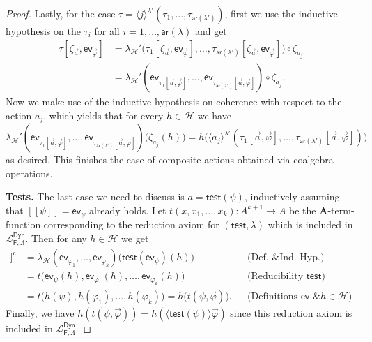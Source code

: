 \documentclass[10pt,a4paper]{amsart}
\newcommand{\LTDyn}{\mathcal{L}_{\func{F}, \Pred}^\mathsf{Dyn}}
\newcommand{\NMH}{\mathcal{H}}
\newcommand{\Pred}{\Lambda}
\newcommand{\alg}[1]{\mathbf{#1}}
\newcommand{\arity}{\mathsf{ar}}
\newcommand{\diam}[1]{\langle {#1} \rangle}
\newcommand{\ev}{\mathsf{ev}}
\newcommand{\func}[1]{\mathsf{#1}}
\newcommand{\sem}[1]{[\![{#1}]\!]}
\newcommand{\test}{\mathsf{test}}
\begin{document}
\begin{proof}
Lastly, for the case $\tau = \diam{j}^{\lambda'}(\tau_1, \dots, \tau_{\arity(\lambda')})$, first we use the inductive hypothesis on the $\tau_i$ for all $i = 1,\dots, \arity(\lambda)$ and get 
\begin{align*}
\tau[\zeta_{\vec{a}}, \ev_{\vec{\varphi}}] & = \lambda_\NMH'\big(\tau_1[\zeta_{\vec{a}}, \ev_{\vec{\varphi}}], \dots, \tau_{\arity(\lambda')}[\zeta_{\vec{a}}, \ev_{\vec{\varphi}}]\big) \circ \zeta_{a_j} \\
& = \lambda_\NMH'(\ev_{\tau_1[\vec{a}, \vec{\varphi}]}, \dots, \ev_{\tau_{\arity(\lambda')}[\vec{a}, \vec{\varphi}]} ) \circ \zeta_{a_j}.
\end{align*}
Now we make use of the inductive hypothesis on coherence with respect to the action $a_j$, which yields that for every $h \in \NMH$ we have 
$$
\lambda_\NMH'(\ev_{\tau_1[\vec{a}, \vec{\varphi}]}, \dots, \ev_{\tau_{\arity(\lambda')}[\vec{a}, \vec{\varphi}]} ) \big( \zeta_{a_j}(h)\big) = h\big(\diam{a_j}^{\lambda'} (\tau_1[\vec{a}, \vec{\varphi}], \dots, \tau_{\arity(\lambda')}[\vec{a}, \vec{\varphi}])\big)
$$
as desired. This finishes the case of composite actions obtained via coalgebra operations.

\textbf{Tests.}
The last case we need to discuss is $a = \test(\psi)$, inductively assuming that $\sem{\psi} = \ev_\psi$ already holds. Let $t(x, x_1, \dots, x_k) \colon A^{k+1} \to A$ be the $\alg{A}$-term-function corresponding to the reduction axiom for $(\test, \lambda)$ which is included in $\LTDyn$. Then for any $h \in \NMH$ we get  
\begin{align*}
\sem{\diam{\test(\psi)}^\lambda(\vec{\varphi})}^\mathrm{c} & = \lambda_{\NMH}(\ev_{\varphi_1}, \dots, \ev_{\varphi_k})\big(\test(\ev_{\psi})(h)\big) && \text{(Def. \& Ind. Hyp.)} \\ 
& = t\big(\ev_{\psi}(h), \ev_{\varphi_1}(h), \dots, \ev_{\varphi_k}(h)\big) && \text{(Reducibility $\test$)} \\ 
& = t\big(h(\psi), h(\varphi_1), \dots,h(\varphi_k)\big)  = h\big(t(\psi, \vec{\varphi})\big). && \text{(Definitions $\ev$ \& $h \in \NMH$)}  
\end{align*} 
Finally, we have $h(t(\psi, \vec{\varphi})) = h(\diam{\test(\psi)}\vec{\varphi})$ since this reduction axiom is included in $\LTDyn$.   
\end{proof}
\end{document}
